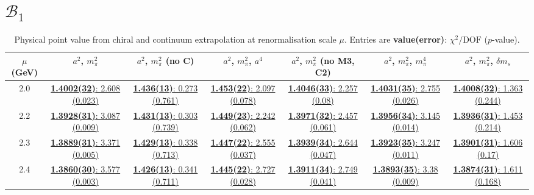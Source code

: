 \documentclass[12pt]{extarticle}
\begin{document}
\section{$\mathcal{B}_1$}
\begin{table}[h!]
\begin{center}
\begin{tabular}{|c|c|c|c|c|c|c|}
\hline
$\mu$ (GeV) & $a^2$, $m_\pi^2$& $a^2$, $m_\pi^2$ (no C)& $a^2$, $m_\pi^2$, $a^4$& $a^2$, $m_\pi^2$ (no M3, C2)& $a^2$, $m_\pi^2$, $m_\pi^4$& $a^2$, $m_\pi^2$, $\delta m_s$\\
\hline
2.0& \hyperlink{VVpAA/NPR/bag_a2m2_20.pdf.1}{\textbf{1.4002(32)}: 2.608 (0.023)} & \hyperlink{VVpAA/NPR/bag_a2m2noC_20.pdf.1}{\textbf{1.436(13)}: 0.273 (0.761)} & \hyperlink{VVpAA/NPR/bag_a2a4m2_20.pdf.1}{\textbf{1.453(22)}: 2.097 (0.078)} & \hyperlink{VVpAA/NPR/bag_a2m2mcut_20.pdf.1}{\textbf{1.4046(33)}: 2.257 (0.08)} & \hyperlink{VVpAA/NPR/bag_a2m2m4_20.pdf.1}{\textbf{1.4031(35)}: 2.755 (0.026)} & \hyperlink{VVpAA/NPR/bag_a2m2delm_20.pdf.1}{\textbf{1.4008(32)}: 1.363 (0.244)}\\
2.2& \hyperlink{VVpAA/NPR/bag_a2m2_22.pdf.1}{\textbf{1.3928(31)}: 3.087 (0.009)} & \hyperlink{VVpAA/NPR/bag_a2m2noC_22.pdf.1}{\textbf{1.431(13)}: 0.303 (0.739)} & \hyperlink{VVpAA/NPR/bag_a2a4m2_22.pdf.1}{\textbf{1.449(23)}: 2.242 (0.062)} & \hyperlink{VVpAA/NPR/bag_a2m2mcut_22.pdf.1}{\textbf{1.3971(32)}: 2.457 (0.061)} & \hyperlink{VVpAA/NPR/bag_a2m2m4_22.pdf.1}{\textbf{1.3956(34)}: 3.145 (0.014)} & \hyperlink{VVpAA/NPR/bag_a2m2delm_22.pdf.1}{\textbf{1.3936(31)}: 1.453 (0.214)}\\
2.3& \hyperlink{VVpAA/NPR/bag_a2m2_23.pdf.1}{\textbf{1.3889(31)}: 3.371 (0.005)} & \hyperlink{VVpAA/NPR/bag_a2m2noC_23.pdf.1}{\textbf{1.429(13)}: 0.338 (0.713)} & \hyperlink{VVpAA/NPR/bag_a2a4m2_23.pdf.1}{\textbf{1.447(22)}: 2.555 (0.037)} & \hyperlink{VVpAA/NPR/bag_a2m2mcut_23.pdf.1}{\textbf{1.3939(34)}: 2.644 (0.047)} & \hyperlink{VVpAA/NPR/bag_a2m2m4_23.pdf.1}{\textbf{1.3923(35)}: 3.247 (0.011)} & \hyperlink{VVpAA/NPR/bag_a2m2delm_23.pdf.1}{\textbf{1.3901(31)}: 1.606 (0.17)}\\
2.4& \hyperlink{VVpAA/NPR/bag_a2m2_24.pdf.1}{\textbf{1.3860(30)}: 3.577 (0.003)} & \hyperlink{VVpAA/NPR/bag_a2m2noC_24.pdf.1}{\textbf{1.426(13)}: 0.341 (0.711)} & \hyperlink{VVpAA/NPR/bag_a2a4m2_24.pdf.1}{\textbf{1.445(22)}: 2.727 (0.028)} & \hyperlink{VVpAA/NPR/bag_a2m2mcut_24.pdf.1}{\textbf{1.3911(34)}: 2.749 (0.041)} & \hyperlink{VVpAA/NPR/bag_a2m2m4_24.pdf.1}{\textbf{1.3893(35)}: 3.38 (0.009)} & \hyperlink{VVpAA/NPR/bag_a2m2delm_24.pdf.1}{\textbf{1.3874(31)}: 1.611 (0.168)}\\
\hline
\end{tabular}
\caption{Physical point value from chiral and continuum extrapolation at renormalisation scale $\mu$. Entries are \textbf{value(error)}: $\chi^2/\text{DOF}$ ($p$-value).}
\end{center}
\end{table}
\end{document}

